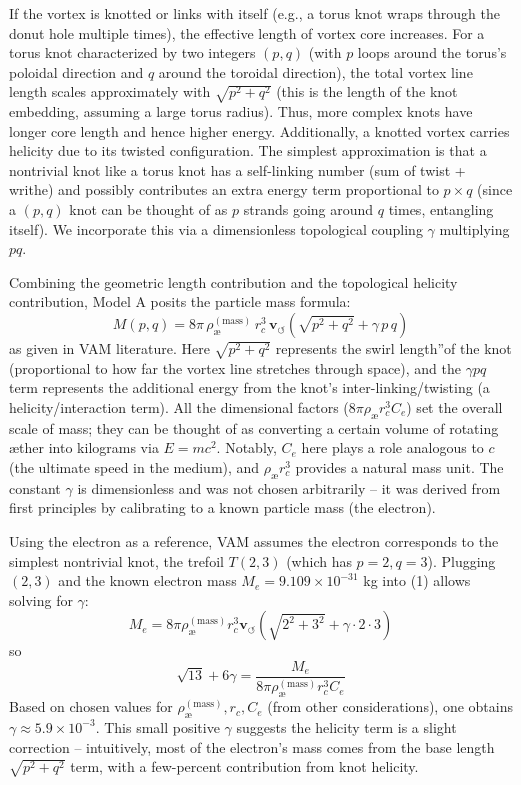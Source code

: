 \documentclass[a4paper,12pt]{article}
\begin{document}
If the vortex is knotted or links with itself (e.g., a torus knot wraps through the donut hole multiple times), the effective length of vortex core increases. For a torus knot characterized by two integers $(p, q)$ (with $p$ loops around the torus's poloidal direction and $q$ around the toroidal direction), the total vortex line length scales approximately with $\sqrt{p^2+q^2}$ (this is the length of the knot embedding, assuming a large torus radius). Thus, more complex knots have longer core length and hence higher energy. Additionally, a knotted vortex carries helicity due to its twisted configuration. The simplest approximation is that a nontrivial knot like a torus knot has a self-linking number (sum of twist + writhe) and possibly contributes an extra energy term proportional to $p \times q$ (since a $(p,q)$ knot can be thought of as $p$ strands going around $q$ times, entangling itself). We incorporate this via a dimensionless topological coupling $\gamma$ multiplying $p q$.

Combining the geometric length contribution and the topological helicity contribution, Model A posits the particle mass formula:
\begin{equation}
    \boxed{  M(p,q) = 8\pi\,\rho_{\text{\ae}}^{(\text{mass})}\,r_c^3\,\mathbf{v}_{\scriptscriptstyle\boldsymbol{\circlearrowleft}} \left(\sqrt{p^2 + q^2} + \gamma\, p\,q\right)     }
\end{equation}
as given in VAM literature. Here $\sqrt{p^2+q^2}$ represents the \grqq swirl length\textquotedblright of the knot (proportional to how far the vortex line stretches through space), and the $\gamma p q$ term represents the additional energy from the knot's inter-linking/twisting (a helicity/interaction term). All the dimensional factors ($8\pi \rho_{\text{\ae}} r_c^3 C_e$) set the overall scale of mass; they can be thought of as converting a certain volume of rotating æther into kilograms via $E=mc^2$. Notably, $C_e$ here plays a role analogous to $c$ (the ultimate speed in the medium), and $\rho_{\text{\ae}} r_c^3$ provides a natural mass unit. The constant $\gamma$ is dimensionless and was not chosen arbitrarily – it was derived from first principles by calibrating to a known particle mass (the electron).

Using the electron as a reference, VAM assumes the electron corresponds to the simplest nontrivial knot, the trefoil $T(2,3)$ (which has $p=2,q=3$). Plugging $(2,3)$ and the known electron mass $M_e = 9.109\times10^{-31}$ kg into (1) allows solving for $\gamma$:
\[
    M_e = 8\pi \rho_{\text{\ae}}^{(\text{mass})} r_c^3 \mathbf{v}_{\scriptscriptstyle\boldsymbol{\circlearrowleft}} \left(\sqrt{2^2+3^2} + \gamma \cdot 2\cdot3\right)
\]
so
\[
    \sqrt{13} + 6\gamma = \frac{M_e}{8\pi \rho_{\text{\ae}}^{(\text{mass})} r_c^3 C_e}
\]
Based on chosen values for $\rho_{\text{\ae}}^{(\text{mass})}, r_c, C_e$ (from other considerations), one obtains $\gamma \approx 5.9\times10^{-3}$. This small positive $\gamma$ suggests the helicity term is a slight correction -- intuitively, most of the electron's mass comes from the base length $\sqrt{p^2+q^2}$ term, with a few-percent contribution from knot helicity.
\end{document}
